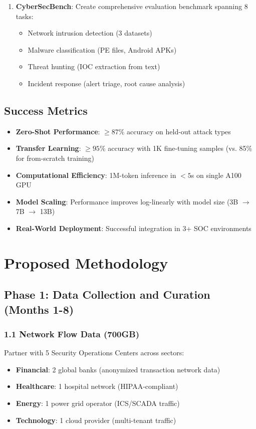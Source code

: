 \documentclass[11pt]{article}
\begin{document}
\begin{enumerate}[label=\textbf{O\arabic*.},leftmargin=*]
    \item \textbf{CyberSecBench}: Create comprehensive evaluation benchmark spanning 8 tasks:
    \begin{itemize}
        \item Network intrusion detection (3 datasets)
        \item Malware classification (PE files, Android APKs)
        \item Threat hunting (IOC extraction from text)
        \item Incident response (alert triage, root cause analysis)
    \end{itemize}
\end{enumerate}

\subsection{Success Metrics}

\begin{itemize}
    \item \textbf{Zero-Shot Performance}: $\geq 87\%$ accuracy on held-out attack types
    \item \textbf{Transfer Learning}: $\geq 95\%$ accuracy with 1K fine-tuning samples (vs. 85\% for from-scratch training)
    \item \textbf{Computational Efficiency}: 1M-token inference in $< 5$s on single A100 GPU
    \item \textbf{Model Scaling}: Performance improves log-linearly with model size (3B $\rightarrow$ 7B $\rightarrow$ 13B)
    \item \textbf{Real-World Deployment}: Successful integration in 3+ SOC environments
\end{itemize}

\section{Proposed Methodology}

\subsection{Phase 1: Data Collection and Curation (Months 1-8)}

\subsubsection{1.1 Network Flow Data (700GB)}

Partner with 5 Security Operations Centers across sectors:
\begin{itemize}
    \item \textbf{Financial}: 2 global banks (anonymized transaction network data)
    \item \textbf{Healthcare}: 1 hospital network (HIPAA-compliant)
    \item \textbf{Energy}: 1 power grid operator (ICS/SCADA traffic)
    \item \textbf{Technology}: 1 cloud provider (multi-tenant traffic)
\end{itemize}
\end{document}
